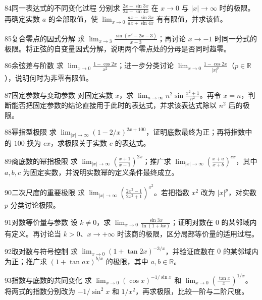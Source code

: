 \begin{exercise}{84}{同一表达式的不同变化过程}
分别求 $\frac{2x-\sin3x}{2x+\sin4x}$ 在 $x\to0$ 与 $|x|\to\infty$ 时的极限。再确定实数 $a$ 的全部取值，使 $\lim_{x\to0}\frac{ax-\sin3x}{ax+\sin4x}$ 有有限值，并求该值。
\end{exercise}
\begin{exercise}{85}{复合零点的因式分解}
求 $\lim_{x\to3}\frac{\sin(x^2-2x-3)}{x-3}$；再讨论 $x\to-1$ 时同一分式的极限。将正弦的自变量因式分解，说明两个零点处的分母是否同时趋零。
\end{exercise}
\begin{exercise}{86}{余弦差与阶数}
求 $\lim_{x\to0}\frac{1-\cos2x}{x^2}$；进一步分类讨论 $\lim_{x\to0}\frac{1-\cos2x}{|x|^p}$（$p\in\mathbb R$），说明何时为非零有限值。
\end{exercise}
\begin{exercise}{87}{固定参数与变动参数}
对固定实数 $x$，求 $\lim_{n\to\infty}n^2\sin\frac{x^2+1}{n^2}$。再令 $x=n$，判断能否把固定参数的结论直接用于此时的表达式，并求该表达式除以 $n^2$ 后的极限。
\end{exercise}
\begin{exercise}{88}{幂指型极限}
求 $\lim_{|x|\to\infty}(1-2/x)^{2x+100}$，证明底数最终为正；再将指数中的 $100$ 换为 $c x$，求极限关于实数 $c$ 的表达式。
\end{exercise}
\begin{exercise}{89}{商底数的幂指极限}
求 $\lim_{|x|\to\infty}\left(\frac{x+1}{x-1}\right)^{2x}$；推广求 $\lim_{|x|\to\infty}\left(\frac{x+a}{x+b}\right)^{cx}$，其中 $a,b,c$ 为固定实数，并说明实数幂的定义条件最终成立。
\end{exercise}
\begin{exercise}{90}{二次尺度的重要极限}
求 $\lim_{|x|\to\infty}\left(\frac{2x^2-1}{2x^2+1}\right)^{x^2}$。若把指数 $x^2$ 改为 $|x|^p$，对实数 $p$ 分类讨论极限。
\end{exercise}
\begin{exercise}{91}{对数等价量与参数}
设 $k\ne0$，求 $\lim_{x\to0}\frac{\sin3x}{\ln(1+kx)}$；证明对数在 $0$ 的某邻域内有定义。再讨论当 $k>0$、$x\to+\infty$ 时该商的极限，区分局部等价量的适用过程。
\end{exercise}
\begin{exercise}{92}{取对数与符号控制}
求 $\lim_{x\to0}(1+\tan2x)^{-3/x}$，并验证底数在 $0$ 的某邻域内为正；推广求 $(1+\tan ax)^{b/x}$ 的极限，其中 $a,b\in\mathbb R$。
\end{exercise}
\begin{exercise}{93}{指数与底数的共同变化}
求 $\lim_{x\to0}(\cos x)^{-1/\sin x}$ 和 $\lim_{x\to0}\left(\frac{\tan x}{x}\right)^{1/x}$。将两式的指数分别改为 $-1/\sin^2x$ 和 $1/x^2$，再求极限，比较一阶与二阶尺度。
\end{exercise}
